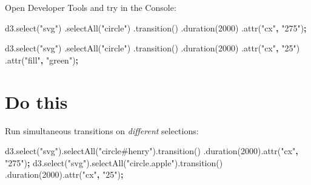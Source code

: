 \documentclass[openany]{book}
\newenvironment{Shaded}{\begin{snugshade}}{\end{snugshade}}
\newcommand{\AttributeTok}[1]{\textcolor[rgb]{0.77,0.63,0.00}{#1}}
\newcommand{\DecValTok}[1]{\textcolor[rgb]{0.00,0.00,0.81}{#1}}
\newcommand{\NormalTok}[1]{#1}
\newcommand{\OperatorTok}[1]{\textcolor[rgb]{0.81,0.36,0.00}{\textbf{#1}}}
\newcommand{\StringTok}[1]{\textcolor[rgb]{0.31,0.60,0.02}{#1}}
\newcommand{\VariableTok}[1]{\textcolor[rgb]{0.00,0.00,0.00}{#1}}
\begin{document}
Open Developer Tools and try in the Console:

\begin{Shaded}
\begin{Highlighting}[]
\VariableTok{d3}\NormalTok{.}\AttributeTok{select}\NormalTok{(}\StringTok{"svg"}\NormalTok{)}
\NormalTok{  .}\AttributeTok{selectAll}\NormalTok{(}\StringTok{"circle"}\NormalTok{)}
\NormalTok{  .}\AttributeTok{transition}\NormalTok{()}
\NormalTok{  .}\AttributeTok{duration}\NormalTok{(}\DecValTok{2000}\NormalTok{)}
\NormalTok{  .}\AttributeTok{attr}\NormalTok{(}\StringTok{"cx"}\OperatorTok{,} \StringTok{"275"}\NormalTok{)}\OperatorTok{;}
\end{Highlighting}
\end{Shaded}

\begin{Shaded}
\begin{Highlighting}[]
\VariableTok{d3}\NormalTok{.}\AttributeTok{select}\NormalTok{(}\StringTok{"svg"}\NormalTok{)}
\NormalTok{  .}\AttributeTok{selectAll}\NormalTok{(}\StringTok{"circle"}\NormalTok{)}
\NormalTok{  .}\AttributeTok{transition}\NormalTok{()}
\NormalTok{  .}\AttributeTok{duration}\NormalTok{(}\DecValTok{2000}\NormalTok{)}
\NormalTok{  .}\AttributeTok{attr}\NormalTok{(}\StringTok{"cx"}\OperatorTok{,} \StringTok{"25"}\NormalTok{)}
\NormalTok{  .}\AttributeTok{attr}\NormalTok{(}\StringTok{"fill"}\OperatorTok{,} \StringTok{"green"}\NormalTok{)}\OperatorTok{;}
\end{Highlighting}
\end{Shaded}

\hypertarget{do-this}{%
\section{Do this}\label{do-this}}

Run simultaneous transitions on \emph{different} selections:

\begin{Shaded}
\begin{Highlighting}[]
\VariableTok{d3}\NormalTok{.}\AttributeTok{select}\NormalTok{(}\StringTok{"svg"}\NormalTok{).}\AttributeTok{selectAll}\NormalTok{(}\StringTok{"circle#henry"}\NormalTok{).}\AttributeTok{transition}\NormalTok{()}
\NormalTok{    .}\AttributeTok{duration}\NormalTok{(}\DecValTok{2000}\NormalTok{).}\AttributeTok{attr}\NormalTok{(}\StringTok{"cx"}\OperatorTok{,} \StringTok{"275"}\NormalTok{)}\OperatorTok{;}
\VariableTok{d3}\NormalTok{.}\AttributeTok{select}\NormalTok{(}\StringTok{"svg"}\NormalTok{).}\AttributeTok{selectAll}\NormalTok{(}\StringTok{"circle.apple"}\NormalTok{).}\AttributeTok{transition}\NormalTok{()}
\NormalTok{    .}\AttributeTok{duration}\NormalTok{(}\DecValTok{2000}\NormalTok{).}\AttributeTok{attr}\NormalTok{(}\StringTok{"cx"}\OperatorTok{,} \StringTok{"25"}\NormalTok{)}\OperatorTok{;}
\end{Highlighting}
\end{Shaded}
\end{document}
